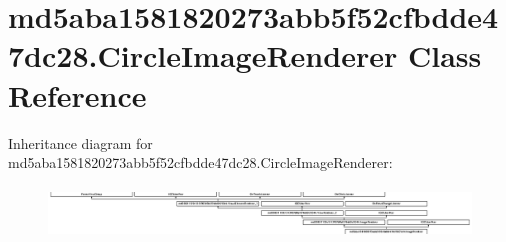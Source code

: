 \hypertarget{classmd5aba1581820273abb5f52cfbdde47dc28_1_1CircleImageRenderer}{}\section{md5aba1581820273abb5f52cfbdde47dc28.\+Circle\+Image\+Renderer Class Reference}
\label{classmd5aba1581820273abb5f52cfbdde47dc28_1_1CircleImageRenderer}
Inheritance diagram for md5aba1581820273abb5f52cfbdde47dc28.\+Circle\+Image\+Renderer\+:\begin{figure}[H]
\begin{center}
\leavevmode
\includegraphics[height=1.372549cm]{classmd5aba1581820273abb5f52cfbdde47dc28_1_1CircleImageRenderer}
\end{center}
\end{figure}
